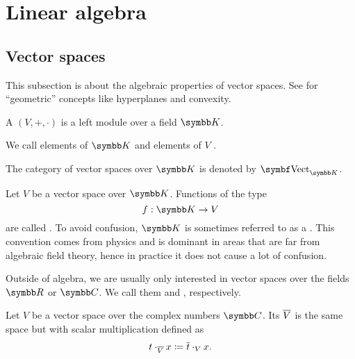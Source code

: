 \section{Linear algebra}\label{sec:linear_algebra}
\subsection{Vector spaces}\label{subsec:vector_spaces}

This subsection is about the algebraic properties of vector spaces. See  for \enquote{geometric} concepts like hyperplanes and convexity.

\begin{definition}\label{def:vector_space}
  A  \( (V, +, \cdot) \) is a left module over a field \( \K \).

  We call elements of \( \K \)  and elements of \( V \) .

  The category of vector spaces over \( \K \) is denoted by \( \Cat{Vect}_{\K} \).
\end{definition}

\begin{definition}\label{def:vector_field}
  Let \( V \) be a vector space over \( \K \). Functions of the type
  \begin{equation*}
    f: \K \to V
  \end{equation*}
  are called . To avoid confusion, \( \K \) is sometimes referred to as a . This convention comes from physics and is dominant in areas that are far from algebraic field theory, hence in practice it does not cause a lot of confusion.
\end{definition}

\begin{remark}\label{remark:real_vector_space}
  Outside of algebra, we are usually only interested in vector spaces over the fields \( \R \) or \( \C \). We call them  and , respectively.
\end{remark}

\begin{definition}\label{def:complex_conjucate_vector_space}
  Let \( V \) be a vector space over the complex numbers \( \C \). Its  \( \overline{V} \) is the same space but with scalar multiplication defined as
  \begin{equation*}
    t \cdot_{\overline{V}} x \coloneqq \overline{t} \cdot_V x.
  \end{equation*}
\end{definition}

